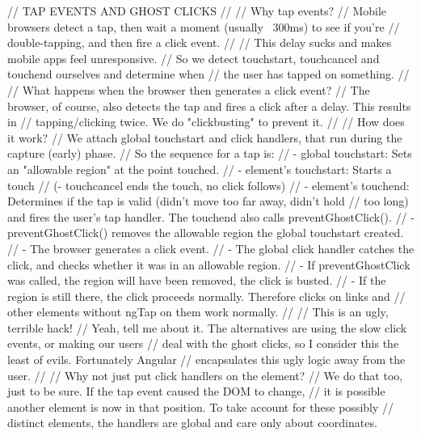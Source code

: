 \begin{DoxyCodeInclude}
  \textcolor{comment}{// TAP EVENTS AND GHOST CLICKS}
  \textcolor{comment}{//}
  \textcolor{comment}{// Why tap events?}
  \textcolor{comment}{// Mobile browsers detect a tap, then wait a moment (usually ~300ms) to see if you're}
  \textcolor{comment}{// double-tapping, and then fire a click event.}
  \textcolor{comment}{//}
  \textcolor{comment}{// This delay sucks and makes mobile apps feel unresponsive.}
  \textcolor{comment}{// So we detect touchstart, touchcancel and touchend ourselves and determine when}
  \textcolor{comment}{// the user has tapped on something.}
  \textcolor{comment}{//}
  \textcolor{comment}{// What happens when the browser then generates a click event?}
  \textcolor{comment}{// The browser, of course, also detects the tap and fires a click after a delay. This results in}
  \textcolor{comment}{// tapping/clicking twice. We do "clickbusting" to prevent it.}
  \textcolor{comment}{//}
  \textcolor{comment}{// How does it work?}
  \textcolor{comment}{// We attach global touchstart and click handlers, that run during the capture (early) phase.}
  \textcolor{comment}{// So the sequence for a tap is:}
  \textcolor{comment}{// - global touchstart: Sets an "allowable region" at the point touched.}
  \textcolor{comment}{// - element's touchstart: Starts a touch}
  \textcolor{comment}{// (- touchcancel ends the touch, no click follows)}
  \textcolor{comment}{// - element's touchend: Determines if the tap is valid (didn't move too far away, didn't hold}
  \textcolor{comment}{//   too long) and fires the user's tap handler. The touchend also calls preventGhostClick().}
  \textcolor{comment}{// - preventGhostClick() removes the allowable region the global touchstart created.}
  \textcolor{comment}{// - The browser generates a click event.}
  \textcolor{comment}{// - The global click handler catches the click, and checks whether it was in an allowable region.}
  \textcolor{comment}{//     - If preventGhostClick was called, the region will have been removed, the click is busted.}
  \textcolor{comment}{//     - If the region is still there, the click proceeds normally. Therefore clicks on links and}
  \textcolor{comment}{//       other elements without ngTap on them work normally.}
  \textcolor{comment}{//}
  \textcolor{comment}{// This is an ugly, terrible hack!}
  \textcolor{comment}{// Yeah, tell me about it. The alternatives are using the slow click events, or making our users}
  \textcolor{comment}{// deal with the ghost clicks, so I consider this the least of evils. Fortunately Angular}
  \textcolor{comment}{// encapsulates this ugly logic away from the user.}
  \textcolor{comment}{//}
  \textcolor{comment}{// Why not just put click handlers on the element?}
  \textcolor{comment}{// We do that too, just to be sure. If the tap event caused the DOM to change,}
  \textcolor{comment}{// it is possible another element is now in that position. To take account for these possibly}
  \textcolor{comment}{// distinct elements, the handlers are global and care only about coordinates.}


\end{DoxyCodeInclude}
